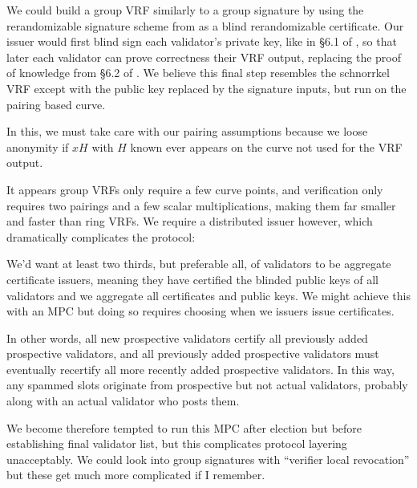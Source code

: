We could build a group VRF similarly to a group signature by using the rerandomizable signature scheme from \cite{PS16} as a blind rerandomizable certificate.  Our issuer would first blind sign each validator's private key, like in \S6.1 of \cite{PS16}, so that later each validator can prove correctness their VRF output, replacing the proof of knowledge from \S6.2 of \cite{PS16}.  We believe this final step resembles the schnorrkel VRF except with the public key replaced by the signature inputs, but run on the pairing based curve.

In this, we must take care with our pairing assumptions because we loose anonymity if $x H$ with $H$ known ever appears on the curve not used for the VRF output.  

It appears group VRFs only require a few curve points, and verification only requires two pairings and a few scalar multiplications, making them far smaller and faster than ring VRFs.  We require a distributed issuer however, which dramatically complicates the protocol:

We'd want at least two thirds, but preferable all, of validators to be aggregate certificate issuers, meaning they have certified the blinded public keys of all validators and we aggregate all certificates and public keys.  We might achieve this with an MPC but doing so requires choosing when we issuers issue certificates.  

In other words, all new prospective validators certify all previously added prospective validators, and all previously added prospective validators must eventually recertify all more recently added prospective validators.  In this way, any spammed slots originate from prospective but not actual validators, probably along with an actual validator who posts them.  

We become therefore tempted to run this MPC after election but before establishing final validator list, but this complicates protocol layering unacceptably.  We could look into group signatures with ``verifier local revocation'' but these get much more complicated if I remember.




